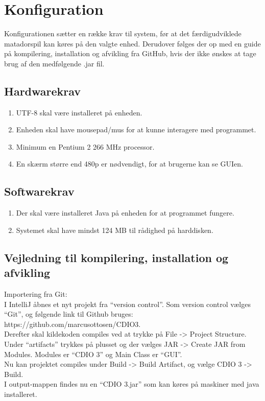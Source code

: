 \section{Konfiguration}
Konfigurationen sætter en række krav til system, før at det færdigudviklede matadorspil kan køres på den valgte enhed. Derudover følges der op med en guide på kompilering, installation og afvikling fra GitHub, hvis der ikke ønskes at tage brug af den medfølgende .jar fil.
\subsection{Hardwarekrav}
\begin{enumerate}
\item UTF-8 skal være installeret på enheden.
\item Enheden skal have mousepad/mus for at kunne interagere med programmet.
\item Minimum en Pentium 2 266 MHz processor.
\item En skærm større end 480p er nødvendigt, for at brugerne kan se GUIen.
\end{enumerate}


\subsection{Softwarekrav}
\begin{enumerate}
\item Der skal være installeret Java på enheden for at programmet fungere.
\item Systemet skal have mindst 124 MB til rådighed på harddisken.
\end{enumerate}



\subsection{Vejledning til kompilering, installation og afvikling}
Importering fra Git: \\
I IntelliJ åbnes et nyt projekt fra “version control”. Som version control vælges “Git”, og følgende link til Github bruges:
https://github.com/marcusottosen/CDIO3. \\
Derefter skal kildekoden compiles ved at trykke på File -> Project Structure. \\
Under “artifacts” trykkes på plusset og der vælges JAR -> Create JAR from Modules.
Modules er “CDIO 3” og Main Class er “GUI”.\\

Nu kan projektet compiles under Build -> Build Artifact, og vælge CDIO 3 -> Build. \\
I output-mappen findes nu en “CDIO 3.jar” som kan køres på maskiner med java installeret. \cite{CDIO2}